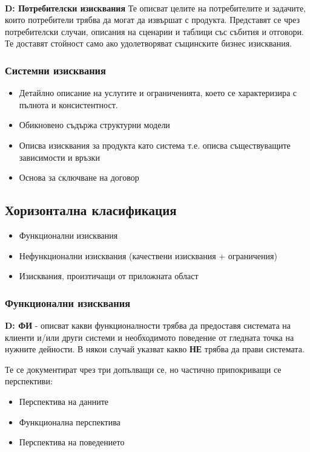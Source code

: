 \documentclass[fleqn,12pt]{article}
\begin{document}
\paragraph{}
\textbf{D: Потребителски изисквания} Те описват целите на потребителите и задачите, които потребители трябва да могат да извършат с продукта. Представят  се чрез потребителски случаи, описания на сценарии и таблици със събития и отговори. Те доставят стойност само ако удолетворяват същинските бизнес изисквания.

\subsubsection{Системни изисквания}
\begin{itemize}
	\item Детайлно описание на услугите и ограниченията, което се характеризира с пълнота и консистентност.
	\item Обикновено съдържа структурни модели
	\item Описва изисквания за продукта като система т.е. описва съществуващите зависимости и връзки
	\item Основа за сключване на договор
\end{itemize}

\subsection{Хоризонтална класификация}

\begin{itemize}
	\item Функционални изисквания
	\item Нефункционални изисквания (качествени изисквания + ограничения)
	\item Изисквания, произтичащи от приложната област
\end{itemize}


\subsubsection{Функционални изисквания}
\textbf{D: ФИ} - описват какви функционалности трябва да предоставя системата на клиенти и/или други системи и необходимото поведение от гледната точка на нужните дейности. В някои случай указват какво \textbf{НЕ} трябва да прави системата.

Те се документират чрез три допълващи се, но частично припокриващи се перспективи:
\begin{itemize}
	\item Перспектива на данните
	\item Функционална перспектива
	\item Перспектива на поведението
\end{itemize}
\end{document}
